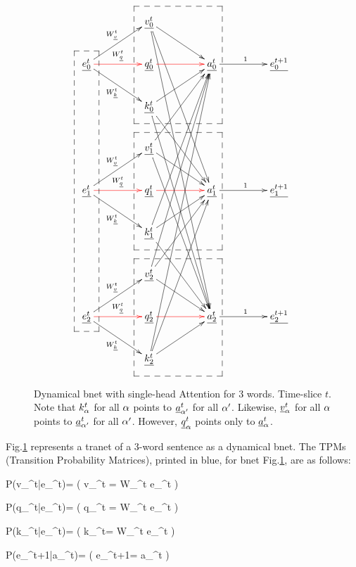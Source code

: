 \begin{figure}[!h]\centering
$$\xymatrix@C=4pc{
&{\underline{v_0^t}}\ar[dr]\ar[ddddr]\ar[dddddddr]&&
\\
{\underline{e_0^t}}\ar[dr]_{W_{\rvk}^t}\ar@[red][r]^{W_{\rvq}^t}\ar[ur]^{W_{\rvv}^t}&{\underline{q_0^t}}\ar@[red][r]&{\underline{a_0^t}}\ar[r]^{1}&{\underline{e_0^{t+1}}}
\\
&{\underline{k_0^t}}\ar[ur]\ar[ddr]\ar[dddddr]&&
\\
&{\underline{v_1^t}}\ar[uur]\ar[dr]\ar[ddddr]&&
\\
{\underline{e_1^t}}\ar[dr]_{W_{\rvk}^t}\ar@[red][r]^{W_{\rvq}^t}\ar[ur]^{W_{\rvv}^t}&{\underline{q_1^t}}\ar@[red][r]&{\underline{a_1^t}}\ar[r]^{1}&{\underline{e_1^{t+1}}}
\\
&{\underline{k_1^t}}\ar[uuuur]\ar[ur]\ar[ddr]&&
\\
&{\underline{v_2^t}}\ar[uuuuur]\ar[uur]\ar[dr]&&
\\
{\underline{e_2^t}}\ar[dr]_{W_{\rvk}^t}\ar@[red][r]^{W_{\rvq}^t}\ar[ur]^{W_{\rvv}^t}&{\underline{q_2^t}}\ar@[red][r]&{\underline{a_2^t}}\ar[r]^{1}&{\underline{e_2^{t+1}}}
\\
&{\underline{k_2^t}}\ar[uuuuuuur]\ar[uuuur]\ar[ur]&&
\save
\POS"2,1"."8,1"."2,1"."8,1"!C*+<1.0em>\frm{--}
\POS"1,2"."3,2"."1,3"."3,3"!C*+<1.5em>\frm{--}
\POS"4,2"."6,2"."4,3"."6,3"!C*+<1.5em>\frm{--}
\POS"7,2"."9,2"."7,3"."9,3"!C*+<1.5em>\frm{--}
\restore
}$$
\caption{Dynamical bnet  with single-head Attention for 3 words. Time-slice $t$.
Note that $k_\alpha^t$
for all $\alpha$
points to ${\underline{a}}^t_{\alpha'}$ for all ${\alpha'}$.
Likewise,
${\underline{v}}_\alpha^t$
for all $\alpha$
points to ${\underline{a}}^t_{\alpha'}$ for all ${\alpha'}$.
However, 
${\underline{q}}_\alpha^t$
points only to ${\underline{a}}^t_\alpha$.
}
\label{fig-transformer-full3}
\end{figure}

Fig.\ref{fig-transformer-full3}
represents a tranet 
of a 3-word sentence as a dynamical bnet.
The TPMs
(Transition Probability Matrices),
printed in blue,
for bnet
Fig.\ref{fig-transformer-full3},
are as follows:


\beq\color{blue}
P(v_\alp^t|e_\alp^t)=
\indi(\;\;\;
v_\alp^t = W_\rvv^t e_\alp^t
\;\;\;)
\eeq

\beq\color{blue}
P(q_\alp^t|e_\alp^t)=
\indi(\;\;\;
q_\alp^t = W_\rvq^t e_\alp^t
\;\;\;)
\eeq

\beq\color{blue}
P(k_\alp^t|e_\alp^t)=
\indi(\;\;\;
k_\alp^t= W_\rvk^t e_\alp^t
\;\;\;)
\eeq

\beq\color{blue}
P(e_\alp^{t+1}|a_\alp^t)=
\indi(\;\;\;
e_\alp^{t+1}= a_\alp^t
\;\;\;)
\eeq

